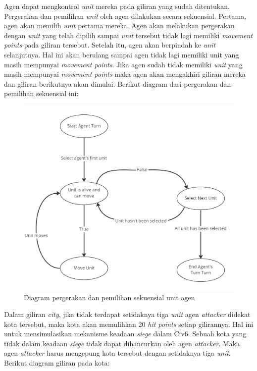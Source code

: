 Agen dapat mengkontrol \emph{unit} mereka pada giliran yang sudah ditentukan.
Pergerakan dan pemilihan \emph{unit} oleh agen dilakukan secara sekuensial. Pertama, agen akan memilih \emph{unit} pertama mereka.
Agen akan melakukan pergerakan dengan \emph{unit} yang telah dipilih sampai \emph{unit} tersebut tidak lagi memiliki \emph{movement points}
pada giliran tersebut.
Setelah itu, agen akan berpindah ke \emph{unit} selanjutnya. Hal ini akan berulang sampai agen tidak lagi memiliki unit yang masih
mempunyai \emph{movement points}. Jika agen sudah tidak memiliki \emph{unit} yang masih mempunyai \emph{movement points}
maka agen akan mengakhiri giliran mereka dan giliran berikutnya akan dimulai.
Berikut diagram dari pergerakan dan pemilihan sekuensial ini:

\begin{figure}[H]
  \centering
    \includegraphics[scale=0.33]{gambar/unit_sequential_movement.jpg}
    \caption{Diagram pergerakan dan pemilihan sekuensial unit agen}
    \label{fig:sequentialMovementDiagram}
\end{figure}

Dalam giliran \emph{city}, jika tidak terdapat setidaknya tiga \emph{unit} agen \emph{attacker} didekat kota tersebut,
maka kota akan memulihkan 20 \emph{hit points} setiap gilirannya. Hal ini untuk mensimulasikan mekanisme keadaan \emph{siege}
dalam Civ6. Sebuah kota yang tidak dalam keadaan \emph{siege} tidak dapat dihancurkan oleh agen \emph{attacker}.
Maka agen \emph{attacker} harus mengepung kota tersebut dengan setidaknya tiga \emph{unit}.
Berikut diagram giliran pada kota:

